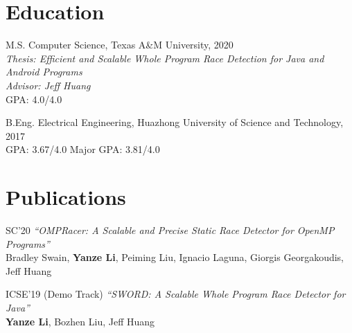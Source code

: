\documentclass[12pt,letterpaper]{report}
\begin{document}

	
	\section*{Education}
	
	\begin{tablist}
		
		
		\item[M.S.]  \tab Computer Science, Texas A\&M University, 2020 \\
		\textit{Thesis: Efficient and Scalable Whole Program Race Detection for Java and Android Programs}\\
		\textit{Advisor: Jeff Huang}\\
		GPA: 4.0/4.0
		
		\item[B.Eng.]  \tab Electrical Engineering, Huazhong University of Science and Technology, 2017 \\
		GPA: 3.67/4.0 \hspace{0.5cm} Major GPA: 3.81/4.0
				
	\end{tablist}


	


	\section*{Publications}
	\begin{tablist}
		 \item[SC'20] \tab \textit{\enquote{OMPRacer: A Scalable and Precise Static Race Detector for OpenMP Programs}}\\
		 		           Bradley Swain, \textbf{Yanze Li}, Peiming Liu, Ignacio Laguna, Giorgis Georgakoudis, Jeff Huang
		\item[ICSE'19] \tab (Demo Track) \textit{\enquote{SWORD: A Scalable Whole Program Race Detector for Java}} \\
							 \textbf{Yanze Li}, Bozhen Liu, Jeff Huang
	\end{tablist}
\end{document}
